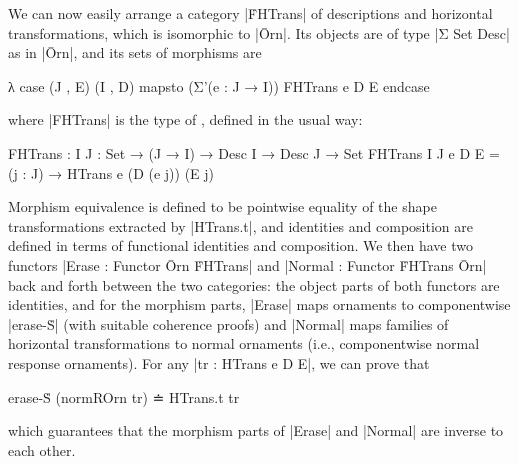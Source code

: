 We can now easily arrange a category |ḞHTrans| of descriptions and horizontal transformations, which is isomorphic to |Ōrn|.
Its objects are of type |Σ Set Desc| as in |Ōrn|, and its sets of morphisms are
\begin{code}
λ case (J , E) (I , D) mapsto (Σ'(e : J → I)) FHTrans e D E endcase
\end{code}
where |FHTrans| is the type of , defined in the usual way:
\begin{code}
FHTrans : {I J : Set} → (J → I) → Desc I → Desc J → Set
FHTrans {I} {J} e D E = (j : J) → HTrans e (D (e j)) (E j)
\end{code}
Morphism equivalence is defined to be pointwise equality of the shape transformations extracted by |HTrans.t|, and identities and composition are defined in terms of functional identities and composition.
We then have two functors |Erase : Functor Ōrn ḞHTrans| and |Normal : Functor ḞHTrans Ōrn| back and forth between the two categories: the object parts of both functors are identities, and for the morphism parts, |Erase| maps ornaments to componentwise |erase-Ṡ| (with suitable coherence proofs) and |Normal| maps families of horizontal transformations to normal ornaments (i.e., componentwise normal response ornaments).
For any |tr : HTrans e D E|, we can prove that
\begin{code}
erase-Ṡ (normROrn tr) ≐ HTrans.t tr
\end{code}
which guarantees that the morphism parts of |Erase| and |Normal| are inverse to each other.

